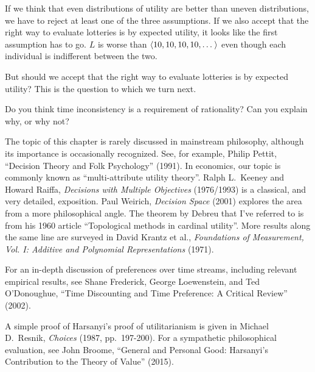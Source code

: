 If we think that even distributions of utility are better than uneven
distributions, we have to reject at least one of the three assumptions. If we
also accept that the right way to evaluate lotteries is by expected utility, it
looks like the first assumption has to go. $L$ is worse than
$\t{10,10,10,10,\ldots}$ even though each individual is indifferent between the
two.

But should we accept that the right way to evaluate lotteries is by
expected utility? This is the question to which we turn next.


\begin{essay}
  Do you think time inconsistency is a requirement of rationality? Can you
  explain why, or why not?
\end{essay}

\begin{sources}

  The topic of this chapter is rarely discussed in mainstream philosophy,
  although its importance is occasionally recognized. See, for example, Philip
  Pettit, ``Decision Theory and Folk Psychology'' (1991). In economics, our
  topic is commonly known as ``multi-attribute utility theory''. Ralph L.\
  Keeney and Howard Raiffa, \emph{Decisions with Multiple Objectives}
  (1976/1993) is a classical, and very detailed, exposition. Paul Weirich,
  \emph{Decision Space} (2001) explores the area from a more philosophical
  angle. The theorem by Debreu that I've referred to is from his 1960 article
  ``Topological methods in cardinal utility''. More results along the same line
  are surveyed in David Krantz et al., \emph{Foundations of Measurement, Vol. I:
    Additive and Polynomial Representations} (1971).

  For an in-depth discussion of preferences over time streams, including
  relevant empirical results, see Shane Frederick, George Loewenstein, and Ted
  O'Donoughue, ``Time Discounting and Time Preference: A Critical Review''
  (2002).

  A simple proof of Harsanyi's proof of utilitarianism is given in Michael D.\
  Resnik, \emph{Choices} (1987, pp.~197-200). For a sympathetic philosophical
  evaluation, see John Broome, ``General and Personal Good: Harsanyi's
  Contribution to the Theory of Value'' (2015).
  
\end{sources}



